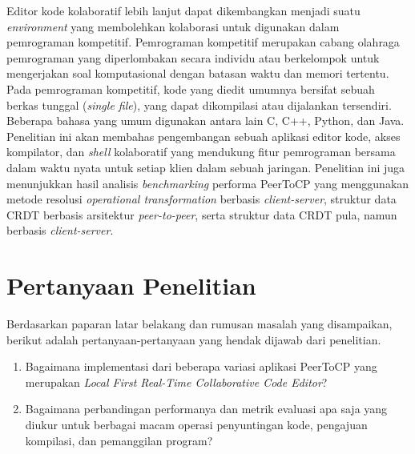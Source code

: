 Editor kode kolaboratif lebih lanjut dapat dikembangkan menjadi suatu \textit{environment} yang membolehkan kolaborasi untuk digunakan dalam pemrograman kompetitif. Pemrograman kompetitif merupakan cabang olahraga pemrograman yang diperlombakan secara individu atau berkelompok untuk mengerjakan soal komputasional dengan batasan waktu dan memori tertentu. Pada pemrograman kompetitif, kode yang diedit umumnya bersifat sebuah berkas tunggal (\textit{single file}), yang dapat dikompilasi atau dijalankan tersendiri. Beberapa bahasa yang umum digunakan antara lain C, C++, Python, dan Java. Penelitian ini akan membahas pengembangan sebuah aplikasi editor kode, akses kompilator, dan \textit{shell} kolaboratif yang mendukung fitur pemrograman bersama dalam waktu nyata untuk setiap klien dalam sebuah jaringan. Penelitian ini juga menunjukkan hasil analisis \textit{benchmarking} performa PeerToCP yang menggunakan metode resolusi \textit{operational transformation} berbasis \textit{client-server}, struktur data CRDT berbasis arsitektur \textit{peer-to-peer}, serta struktur data CRDT pula, namun berbasis \textit{client-server}.



\section{Pertanyaan Penelitian}
\label{sec:definisiMasalah}
Berdasarkan paparan latar belakang dan rumusan masalah yang disampaikan, berikut adalah pertanyaan-pertanyaan yang hendak dijawab dari penelitian.

\begin{enumerate}[noitemsep]
    \item Bagaimana implementasi dari beberapa variasi aplikasi PeerToCP yang merupakan \textit{Local First Real-Time Collaborative Code Editor}?
    \item Bagaimana perbandingan performanya dan metrik evaluasi apa saja yang diukur untuk berbagai macam operasi penyuntingan kode, pengajuan kompilasi, dan pemanggilan program?
\end{enumerate}



